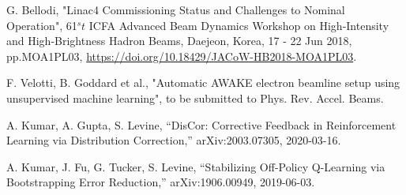 \documentclass[
 reprint,
 amsmath,amssymb,amsfonts,clevref,
 aps,
prstab,
]{revtex4-2}
\begin{document}
\begin{thebibliography}{9}
 G. Bellodi, "Linac4 Commissioning Status and Challenges to Nominal Operation", 61$^st$ ICFA Advanced Beam Dynamics Workshop on High-Intensity and High-Brightness Hadron Beams, Daejeon, Korea, 17 - 22 Jun 2018, pp.MOA1PL03, \url{https://doi.org/10.18429/JACoW-HB2018-MOA1PL03}.

 F. Velotti, B. Goddard et al., "Automatic AWAKE electron beamline setup using unsupervised machine learning", to be submitted to Phys. Rev. Accel. Beams.

 A. Kumar, A. Gupta, S. Levine, “DisCor: Corrective Feedback in Reinforcement Learning via Distribution Correction,” arXiv:2003.07305, 2020-03-16.

 A. Kumar, J. Fu, G. Tucker, S. Levine, “Stabilizing Off-Policy Q-Learning via Bootstrapping Error Reduction,” arXiv:1906.00949, 2019-06-03.




\end{thebibliography}

\newpage{\pagestyle{empty}\cleardoublepage}
\end{document}
